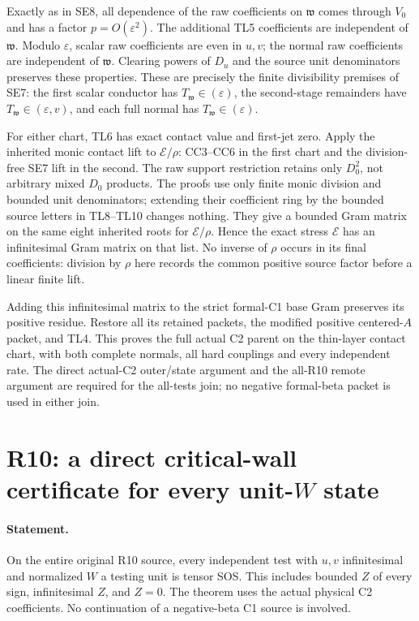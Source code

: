 Exactly as in SE8, all dependence of the raw coefficients on
$\mathfrak w$ comes through $V_0$ and has a factor
$p=O(\varepsilon^2)$. The additional TL5 coefficients are independent
of $\mathfrak w$. Modulo $\varepsilon$, scalar raw coefficients are
even in $u,v$; the normal raw coefficients are independent of
$\mathfrak w$. Clearing powers of $D_u$ and the source unit
denominators preserves these properties. These are precisely the
finite divisibility premises of SE7: the first scalar conductor has
$T_{\mathfrak w}\in(\varepsilon)$, the second-stage remainders have
$T_{\mathfrak w}\in(\varepsilon,v)$, and each full normal has
$T_{\mathfrak w}\in(\varepsilon)$.

For either chart, TL6 has exact contact value and first-jet zero.
Apply the inherited monic contact lift to $\mathscr E/\rho$:
CC3--CC6 in the first chart and the division-free SE7 lift in the
second. The raw support restriction retains only $D_0^2$, not arbitrary
mixed $D_0$ products. The proofs use only finite monic division and
bounded unit denominators; extending their coefficient ring by the
bounded source letters in TL8--TL10 changes nothing. They give a
bounded Gram matrix on the same eight inherited roots for
$\mathscr E/\rho$. Hence the exact stress $\mathscr E$ has an
infinitesimal Gram matrix on that list. No inverse of $\rho$ occurs in
its final coefficients: division by $\rho$ here records the common
positive source factor before a linear finite lift.

Adding this infinitesimal matrix to the strict formal-C1 base Gram
preserves its positive residue. Restore all its retained packets,
the modified positive centered-$A$ packet, and TL4. This proves the
full actual C2 parent on the thin-layer contact chart, with both
complete normals, all hard couplings and every independent rate.
The direct actual-C2 outer/state argument and the all-R10 remote
argument are required for the all-tests join; no negative formal-beta
packet is used in either join.



\section{\texorpdfstring{R10: a direct critical-wall certificate for every unit-$W$ state}{R10: a direct critical-wall certificate for every unit-W state}}
\label{component:pf1aac1dff7c7}

\paragraph{Statement.}
On the entire original R10 source, every independent test with $u,v$
infinitesimal and normalized $W$ a testing unit is tensor SOS. This
includes bounded $Z$ of every sign, infinitesimal $Z$, and $Z=0$.
The theorem uses the actual physical C2 coefficients. No continuation
of a negative-beta C1 source is involved.

